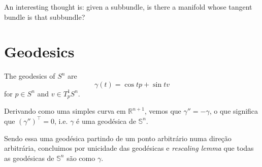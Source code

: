 \documentclass{book}
\begin{document}
An interesting thought is: given a subbundle,
is there a manifold whose tangent
bundle is that subbundle?

\section{Geodesics}
\label{section-geodesics}

\begin{example}
\label{example-geodesics-of-Sn}
The geodesics of $S^n$ are
\begin{equation}
\label{equation-geodesics-of-Sn}
\gamma(t)=\cos t p+\sin t v
\end{equation}
for $p \in S^n$ and $v\in T^1_pS^n$.

Derivando como uma simples curva em
$\mathbb{R}^{n+1}$, vemos que
$\gamma''=-\gamma$, o que significa que
$(\gamma'')^{\top}=0$, i.e. $\gamma$ é
uma geodésica de $\mathbb{S}^n$.

Sendo essa uma geodésica partindo de um ponto
arbitrário numa direção
arbitrária, concluimos por unicidade das
geodésicas e \textit{rescaling lemma}
que todas as geodésicas de $\mathbb{S}^n$ são
como $\gamma$.
\end{example}
\end{document}
